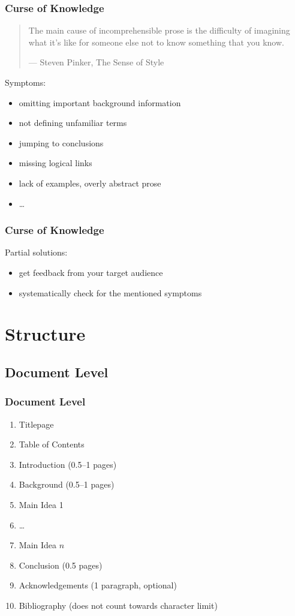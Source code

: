 \documentclass[xetex]{beamer}
\begin{document}
\begin{frame}
  \frametitle{Curse of Knowledge}

  \begin{quote}
    The main cause of incomprehensible prose is the difficulty of imagining what it's like for someone else not to know something that you know.

    --- Steven Pinker, The Sense of Style
  \end{quote}

  \pause
  \medskip

  Symptoms:
  \begin{itemize}[<+->]
    \item omitting important background information
    \item not defining unfamiliar terms
    \item jumping to conclusions
    \item missing logical links
    \item lack of examples, overly abstract prose
    \item \dots
  \end{itemize}
\end{frame}

\begin{frame}
  \frametitle{Curse of Knowledge}

  Partial solutions:
  \begin{itemize}[<+->]
    \item get feedback from your target audience
    \item systematically check for the mentioned symptoms
  \end{itemize}
\end{frame}

\section{Structure}

\subsection{Document Level}

\begin{frame}
  \frametitle{Document Level}

  \begin{enumerate}
    \item Titlepage
    \item Table of Contents
    \item Introduction (0.5--1 pages)
    \item Background (0.5--1 pages)
    \item Main Idea 1
    \item \dots
    \item Main Idea $n$
    \item Conclusion (0.5 pages)
    \item Acknowledgements (1 paragraph, optional)
    \item Bibliography (does not count towards character limit)
  \end{enumerate}
\end{frame}
\end{document}

